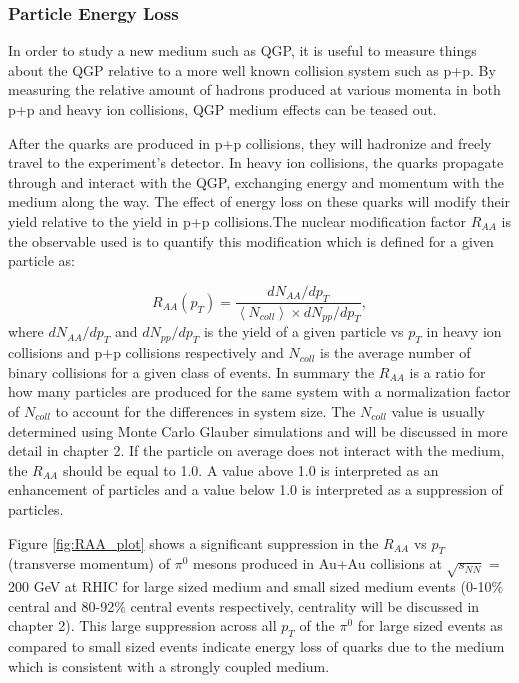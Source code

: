 \subsubsection{Particle Energy Loss}
In order to study a new medium such as QGP, it is useful to measure things about the QGP relative to a more well known collision system such as p+p. By measuring the relative amount of hadrons produced at various momenta in both p+p and heavy ion collisions, QGP medium effects can be teased out.

After the quarks are produced in p+p collisions, they will hadronize and freely travel to the experiment's detector. In heavy ion collisions, the quarks propagate through and interact
with the QGP, exchanging energy and momentum with the medium along the way. The effect of energy loss on these quarks will modify their yield relative to the yield in p+p collisions.The nuclear modification factor $R_{AA}$ is the observable used is to quantify this modification which is defined for a given particle as:

\begin{equation}\label{eqn:raa}
 R_{AA}(p_T) = \frac{dN_{AA}/dp_T}{\left<N_{coll}\right>\times dN_{pp}/dp_T},
\end{equation}
where $dN_{AA}/dp_T$ and $dN_{pp}/dp_T$ is the yield of a given particle vs $p_T$ in heavy ion collisions and p+p collisions respectively and $N_{coll}$ is the average
number of binary collisions for a given class of events. In summary the $R_{AA}$ is a ratio for how many particles are produced for the same system with a normalization factor of $N_{coll}$ to account for the differences in system size. The $N_{coll}$ value is usually determined using Monte Carlo Glauber simulations and will be discussed in more detail in chapter 2. If the particle on average does not interact with the medium, the $R_{AA}$ should be equal to 1.0. A value above 1.0 is interpreted as an enhancement of particles and a value below 1.0 is interpreted as a suppression of particles. 

Figure \ref{fig:RAA_plot} shows a significant suppression in the $R_{AA}$ vs $p_T$ (transverse momentum) of $\pi^0$ mesons produced in Au+Au collisions at $\sqrt{s_{NN}}$ = 200 GeV at RHIC for large sized medium and small sized medium events (0-10$\%$ central and 80-92$\%$ central events respectively, centrality will be discussed in chapter 2). This large suppression across all  $p_T$ of the $\pi^0$ for large sized events as compared to small sized events indicate energy loss of quarks due to the medium which is consistent with a strongly coupled  medium.

